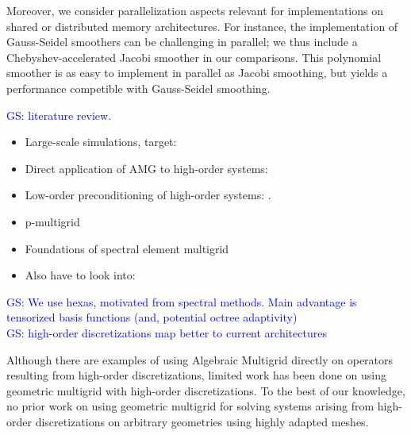 \documentclass[smallcondensed,final]{svjour3}     %
\newcommand{\gsnote}[1]{\textcolor{blue}{GS: #1}}
\begin{document}
Moreover, we consider parallelization aspects relevant for
implementations on shared or distributed memory architectures. For
instance, the implementation of Gauss-Seidel smoothers can be
challenging in parallel; we thus include a Chebyshev-accelerated
Jacobi smoother in our comparisons. This polynomial smoother is as
easy to implement in parallel as Jacobi smoothing, but yields a
performance competible with Gauss-Seidel smoothing.





\noindent
\gsnote{literature review.}
\begin{itemize}

\item Large-scale simulations, target:
\cite{SundarBirosBursteddeEtAl12}

\item Direct application of AMG to high-order systems:
\cite{HeysManteuffelMcCormickEtAl05}

\item Low-order preconditioning of high-order systems:
\cite{Brown10,Kim07,DevilleMund90,HeysManteuffelMcCormickEtAl05,Olson07}.

\item p-multigrid
\cite{HelenbrookMavriplisAtkins03}

\item Foundations of spectral element multigrid
\cite{RonquistPatera87,MadayMunoz88}

\item Also have to look into:
\cite{CanutoGervasioQuarteroni10,DevilleMund90}

\end{itemize}

\noindent
\gsnote{We use hexas, motivated from spectral methods. Main
  advantage is tensorized basis functions (and, potential octree adaptivity)}\\
\gsnote{high-order discretizations map better to current architectures}




Although there are examples of using Algebraic Multigrid directly on
operators resulting from high-order discretizations, limited work
has been done on using geometric multigrid with high-order
discretizations. To the best of our knowledge, no prior work on using
geometric multigrid for solving systems arising from high-order
discretizations on arbitrary geometries using highly adapted meshes.
\end{document}
